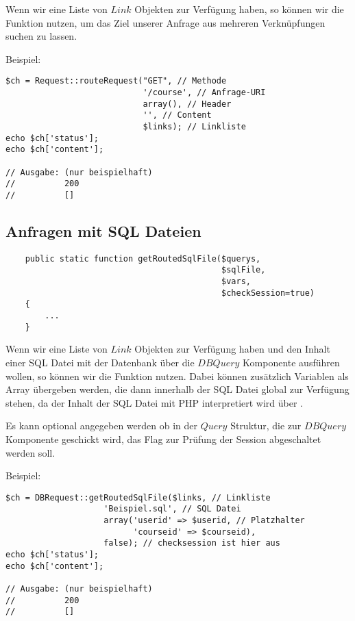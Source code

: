 Wenn wir eine Liste von $Link$ Objekten zur Verfügung haben, so können wir die  Funktion nutzen, um das Ziel unserer Anfrage aus mehreren Verknüpfungen suchen zu lassen.

\begin{minipage}{\textwidth}
Beispiel:
\begin{lstlisting}
$ch = Request::routeRequest("GET", // Methode
                            '/course', // Anfrage-URI
                            array(), // Header
                            '', // Content
                            $links); // Linkliste
echo $ch['status'];
echo $ch['content']; 
                     
// Ausgabe: (nur beispielhaft)
//          200
//          []
\end{lstlisting}
\end{minipage}

\subsection{Anfragen mit SQL Dateien}
\begin{minipage}{\textwidth}
\begin{lstlisting}
    public static function getRoutedSqlFile($querys, 
                                            $sqlFile, 
                                            $vars,
                                            $checkSession=true)
    {
    	...
    }
\end{lstlisting}
\end{minipage}
Wenn wir eine Liste von $Link$ Objekten zur Verfügung haben und den Inhalt einer SQL Datei mit der Datenbank über die $DBQuery$ Komponente ausführen wollen, so können wir die  Funktion nutzen.
Dabei können zusätzlich Variablen als Array übergeben werden, die dann innerhalb der SQL Datei global zur Verfügung stehen, da der Inhalt der SQL Datei mit PHP interpretiert wird über .

Es kann optional angegeben werden ob in der $Query$ Struktur, die zur $DBQuery$ Komponente geschickt wird, das Flag zur Prüfung der Session abgeschaltet werden soll.

\begin{minipage}{\textwidth}
Beispiel:
\begin{lstlisting}
$ch = DBRequest::getRoutedSqlFile($links, // Linkliste
                    'Beispiel.sql', // SQL Datei
                    array('userid' => $userid, // Platzhalter
                          'courseid' => $courseid),
                    false); // checksession ist hier aus
echo $ch['status'];
echo $ch['content']; 
                     
// Ausgabe: (nur beispielhaft)
//          200
//          []
\end{lstlisting}
\end{minipage}